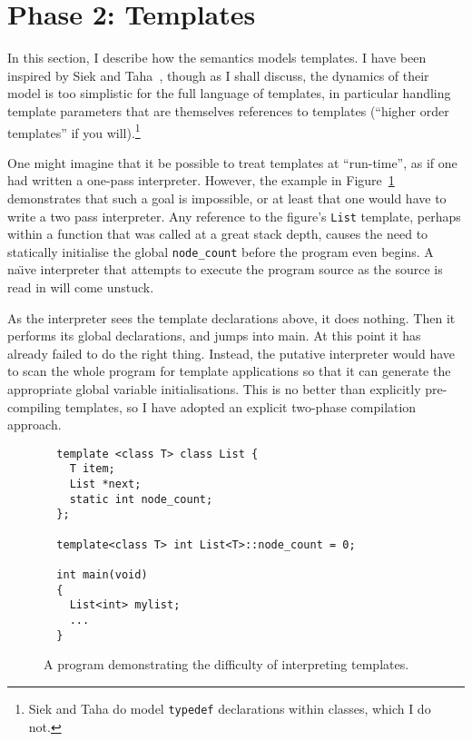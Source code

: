 \documentclass[11pt]{article}
\newcommand{\naive}{na\"\i{}ve}
\begin{document}
\section{Phase 2: Templates}
\label{sec:templates}

In this section, I describe how the semantics models templates.  I
have been inspired by Siek and Taha~\cite{DBLP:conf/ecoop/SiekT06},
though as I shall discuss, the dynamics of their model is too
simplistic for the full language of templates, in particular handling
template parameters that are themselves references to templates
(``higher order templates'' if you will).\footnote{Siek and Taha do
  model \texttt{typedef} declarations within classes, which I do not.}

One might imagine that it be possible to treat templates at
``run-time'', as if one had written a one-pass \cpp{} interpreter.
However, the example in Figure~\ref{fig:templates-not-interpretable}
demonstrates that such a goal is impossible, or at least that one
would have to write a two pass interpreter.  Any reference to the
figure's \texttt{List} template, perhaps within a function that was
called at a great stack depth, causes the need to statically
initialise the global \texttt{node\_count} before the program even
begins.  A \naive{} interpreter that attempts to execute the program
source as the source is read in will come unstuck.

As the interpreter sees the template declarations above, it does
nothing.  Then it performs its global declarations, and jumps into
main.  At this point it has already failed to do the right thing.
Instead, the putative interpreter would have to scan the whole program
for template applications so that it can generate the appropriate
global variable initialisations.  This is no better than explicitly
pre-compiling templates, so I have adopted an explicit two-phase
compilation approach.

\begin{figure}
\begin{verbatim}
  template <class T> class List {
    T item;
    List *next;
    static int node_count;
  };

  template<class T> int List<T>::node_count = 0;

  int main(void)
  {
    List<int> mylist;
    ...
  }
\end{verbatim}
  \caption[A Difficult Program for Template Interpretation]{A program
    demonstrating the difficulty of interpreting templates.}
\label{fig:templates-not-interpretable}
\end{figure}
\end{document}
